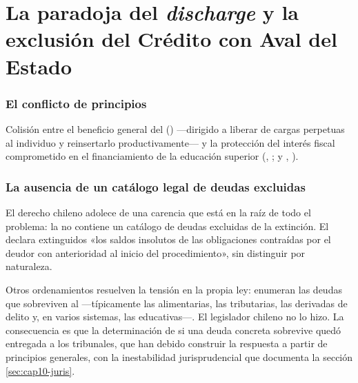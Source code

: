 \chapter{La paradoja del \texorpdfstring{\emph{discharge}}{discharge} y la exclusión del
Crédito con Aval del Estado}
\label{cap:discharge-cae}


\bloqueTeorico

\subsection{El conflicto de principios}

Colisión entre el beneficio general del \discharge{} () ---dirigido a liberar de
cargas perpetuas al individuo y reinsertarlo productivamente--- y la protección del
interés fiscal comprometido en el financiamiento de la educación superior (\Lcae{}, \cite{ley-20027}; y \Lfondosolidario{},
\cite{ley-19287}).

\subsection{La ausencia de un catálogo legal de deudas excluidas}

El derecho chileno adolece de una carencia que está en la raíz de todo el problema: la
\LIR{} \citeyearpar{ley-20720} no contiene un catálogo de deudas excluidas de la extinción.
El  declara extinguidos «los saldos insolutos de las obligaciones contraídas por el
deudor con anterioridad al inicio del procedimiento», sin distinguir por naturaleza.

Otros ordenamientos resuelven la tensión en la propia ley: enumeran las deudas que
sobreviven al \discharge{} ---típicamente las alimentarias, las tributarias, las derivadas de
delito y, en varios sistemas, las educativas---. El legislador chileno no lo hizo. La
consecuencia es que la determinación de si una deuda concreta sobrevive quedó entregada a los
tribunales, que han debido construir la respuesta a partir de principios generales, con la
inestabilidad jurisprudencial que documenta la sección \ref{sec:cap10-juris}.

